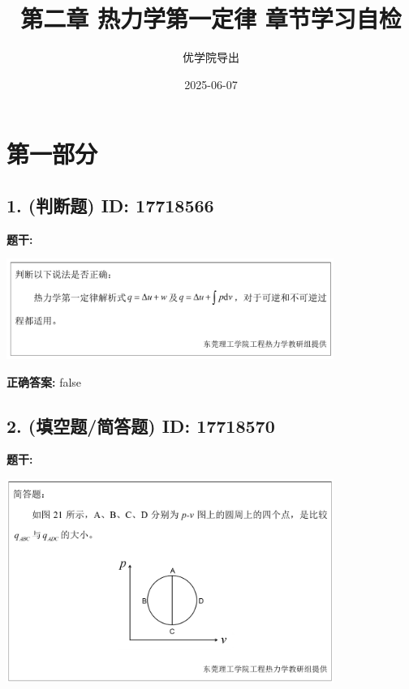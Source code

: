 \documentclass[12pt]{article}
\title{第二章 热力学第一定律 章节学习自检}
\author{优学院导出}
\date{2025-06-07}
\begin{document}
\maketitle

\section*{第一部分}
\hrulefill

\subsection*{1. (判断题) \small ID: 17718566}

\textbf{题干:}


\begin{center}\includegraphics[width=0.8\textwidth, height=0.25\textheight, keepaspectratio]{question_1_17718566/title_img_1.png}\end{center}

\textbf{正确答案:}
false

\vspace{0.5em}\hrulefill\vspace{1em}

\subsection*{2. (填空题/简答题) \small ID: 17718570}

\textbf{题干:}


\begin{center}\includegraphics[width=0.8\textwidth, height=0.25\textheight, keepaspectratio]{question_2_17718570/title_img_1.png}\end{center}
\end{document}
